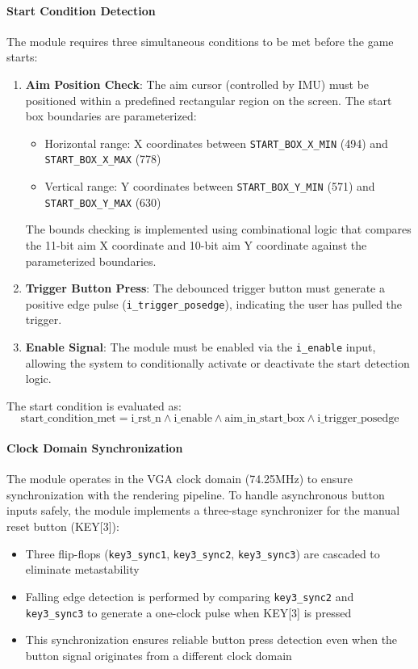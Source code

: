\documentclass[12pt,a4paper]{article}
\begin{document}
\paragraph{Start Condition Detection}
The module requires three simultaneous conditions to be met before the game starts:
\begin{enumerate}
    \item \textbf{Aim Position Check}: The aim cursor (controlled by IMU) must be positioned within a predefined rectangular region on the screen. The start box boundaries are parameterized:
    \begin{itemize}
        \item Horizontal range: X coordinates between \texttt{START\_BOX\_X\_MIN} (494) and \texttt{START\_BOX\_X\_MAX} (778)
        \item Vertical range: Y coordinates between \texttt{START\_BOX\_Y\_MIN} (571) and \texttt{START\_BOX\_Y\_MAX} (630)
    \end{itemize}
    The bounds checking is implemented using combinational logic that compares the 11-bit aim X coordinate and 10-bit aim Y coordinate against the parameterized boundaries.
    \item \textbf{Trigger Button Press}: The debounced trigger button must generate a positive edge pulse (\texttt{i\_trigger\_posedge}), indicating the user has pulled the trigger.
    \item \textbf{Enable Signal}: The module must be enabled via the \texttt{i\_enable} input, allowing the system to conditionally activate or deactivate the start detection logic.
\end{enumerate}

The start condition is evaluated as:
\begin{equation}
\text{start\_condition\_met} = \text{i\_rst\_n} \land \text{i\_enable} \land \text{aim\_in\_start\_box} \land \text{i\_trigger\_posedge}
\end{equation}

\paragraph{Clock Domain Synchronization}
The module operates in the VGA clock domain (74.25MHz) to ensure synchronization with the rendering pipeline. To handle asynchronous button inputs safely, the module implements a three-stage synchronizer for the manual reset button (KEY[3]):
\begin{itemize}
    \item Three flip-flops (\texttt{key3\_sync1}, \texttt{key3\_sync2}, \texttt{key3\_sync3}) are cascaded to eliminate metastability
    \item Falling edge detection is performed by comparing \texttt{key3\_sync2} and \texttt{key3\_sync3} to generate a one-clock pulse when KEY[3] is pressed
    \item This synchronization ensures reliable button press detection even when the button signal originates from a different clock domain
\end{itemize}
\end{document}

